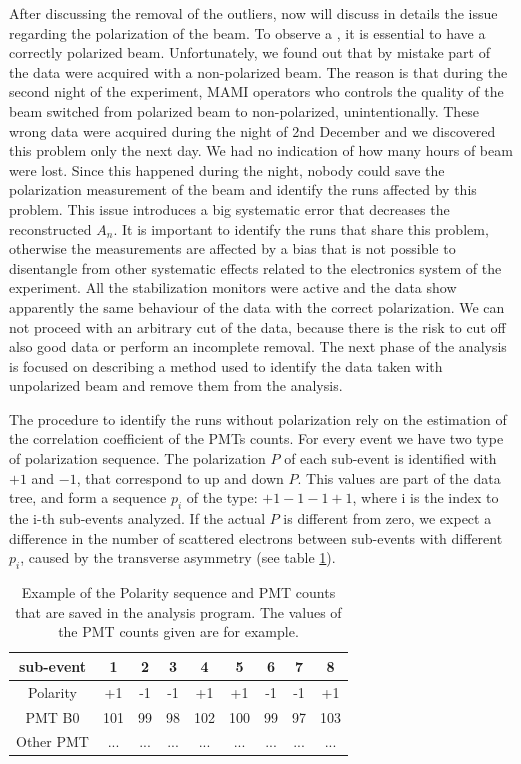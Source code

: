After discussing the removal of the outliers, now will discuss in details the issue regarding the polarization of the beam. To observe a \transv, it is essential to have a correctly polarized beam. Unfortunately, we found out that by mistake part of the data were acquired with a non-polarized beam. The reason is that during the second night of the experiment, MAMI operators who controls the quality of the beam switched from polarized beam to non-polarized, unintentionally. These wrong data were acquired during the night of 2nd December and we discovered this problem only the next day. We had no indication of how many hours of beam were lost. Since this happened during the night, nobody could save the polarization measurement of the beam and identify the runs affected by this problem.
This issue introduces a big systematic error that decreases the reconstructed $A_{n}$. It is important to identify the runs that share this problem, otherwise the measurements are affected by a bias that is not possible to disentangle from other systematic effects related to the electronics system of the experiment. 
All the stabilization monitors were active and the data show apparently the same behaviour of the data with the correct polarization. We can not proceed with an arbitrary cut of the data, because there is the risk to cut off also good data or perform an incomplete removal. The next phase of the analysis is focused on describing a method used to identify the data taken with unpolarized beam and remove them from the analysis.
 
The procedure to identify the runs without polarization rely on the estimation of the correlation coefficient of the PMTs counts. For every event we have two type of polarization sequence. The polarization $P$ of each sub-event is identified with $+1$ and $-1$, that correspond to up and down $P$. This values are part of the data tree, and form a sequence $p_{i}$ of the type: $+1-1-1+1$, where i is the index to the i-th sub-events analyzed. If the actual $P$ is different from zero, we expect a difference in the number of scattered electrons between sub-events with different $p_{i}$, caused by the transverse asymmetry (see table \ref{tab:PolarizationSequence}).

\begin{table}[hbtp]
\centering
\begin{tabular}{c|c|c|c|c|c|c|c|c}
\hline 
sub-event & 1 & 2 & 3 & 4 & 5 & 6 & 7 & 8 \\ 
\hline 
Polarity & +1 & -1 & -1 & +1 & +1 & -1 & -1 & +1 \\ 
PMT B0 & 101 & 99 & 98 & 102 & 100 & 99 & 97 & 103 \\ 
Other PMT & ... & ... & ... & ... & ... & ... & ... & ... \\ 
\hline
\end{tabular}
\caption{Example of the Polarity sequence and PMT counts that are saved in the analysis program. The values of the PMT counts given are for example.}
\label{tab:PolarizationSequence}
\end{table}

